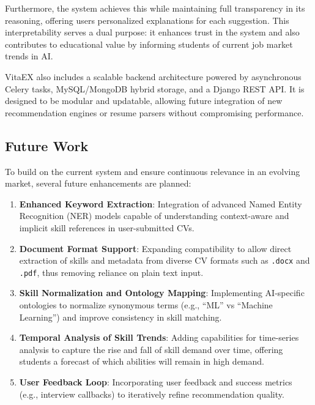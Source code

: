 \documentclass[runningheads]{llncs}
\begin{document}
Furthermore, the system achieves this while maintaining full transparency in its reasoning, offering users personalized explanations for each suggestion. This interpretability serves a dual purpose: it enhances trust in the system and also contributes to educational value by informing students of current job market trends in AI.

VitaEX also includes a scalable backend architecture powered by asynchronous Celery tasks, MySQL/MongoDB hybrid storage, and a Django REST API. It is designed to be modular and updatable, allowing future integration of new recommendation engines or resume parsers without compromising performance.

\subsection*{Future Work}

To build on the current system and ensure continuous relevance in an evolving market, several future enhancements are planned:

\begin{enumerate}
	\item \textbf{Enhanced Keyword Extraction}: Integration of advanced Named Entity Recognition (NER) models capable of understanding context-aware and implicit skill references in user-submitted CVs.
	
	\item \textbf{Document Format Support}: Expanding compatibility to allow direct extraction of skills and metadata from diverse CV formats such as \texttt{.docx} and \texttt{.pdf}, thus removing reliance on plain text input.
	
	\item \textbf{Skill Normalization and Ontology Mapping}: Implementing AI-specific ontologies to normalize synonymous terms (e.g., “ML” vs “Machine Learning”) and improve consistency in skill matching.
	
	\item \textbf{Temporal Analysis of Skill Trends}: Adding capabilities for time-series analysis to capture the rise and fall of skill demand over time, offering students a forecast of which abilities will remain in high demand.
	
	\item \textbf{User Feedback Loop}: Incorporating user feedback and success metrics (e.g., interview callbacks) to iteratively refine recommendation quality.
\end{enumerate}
\end{document}
